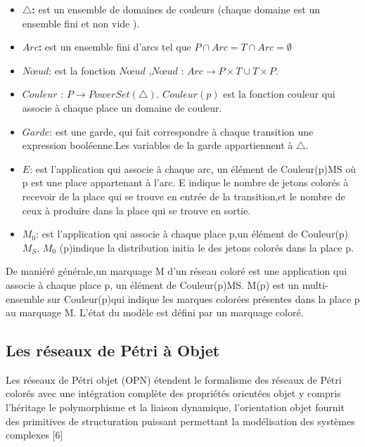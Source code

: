 \begin{itemize}
	\item\textbf{ $\bigtriangleup$:}  est un ensemble de domaines de couleurs (chaque domaine est un ensemble fini et non vide ).
	\item \textbf{$ Arc $:} est un ensemble fini d'arcs tel que $P \cap Arc = T \cap Arc = \emptyset $
	\item \textbf{$Nœud$}:  est la fonction $Nœud$ ,$Nœud$ : $Arc \longrightarrow	P \times T \cup T \times P $.
	
	\item   \textbf{$ Couleur $} : $P \longrightarrow PowerSet(\bigtriangleup)$. $Couleur(p)$ est la fonction couleur qui associe à chaque place un domaine de couleur.
	
	\item \textbf{$ Garde $}: est une garde, qui fait correspondre à chaque transition une expression booléenne.Les variables de la garde appartiennent à $\bigtriangleup$.
	\item \textbf{$ E $}: est l'application qui associe à chaque arc, un élément de Couleur(p)MS où p est une place appartenant à l'arc. E indique le nombre de jetons colorés à recevoir de la place qui se trouve en entrée de la transition,et le nombre de ceux à produire dans la place qui se trouve en sortie. 
	
	\item \textbf{$ M_{0} $}: est l'application qui associe à chaque place p,un élément de Couleur(p) $ M_{S} $. $ M_{0}$ (p)indique la distribution initia le des jetons colorés dans la place p.
	
\end{itemize}



De maniéré générale,un marquage M d’un réseau coloré est une application qui associe à chaque place p, un élément de Couleur(p)MS. M(p) est un multi-ensemble sur Couleur(p)qui indique les marques colorées présentes dans la place p au marquage M. L'état du modèle est défini par un marquage coloré.


\subsection{Les réseaux de Pétri à Objet }


Les réseaux de Pétri objet (OPN) étendent le formalisme des réseaux de Pétri colorés avec une intégration complète des propriétés orientées objet y compris l'héritage le polymorphisme et la liaison dynamique, l'orientation objet fournit des primitives de structuration puissant permettant la modélisation des systèmes complexes [6] 

